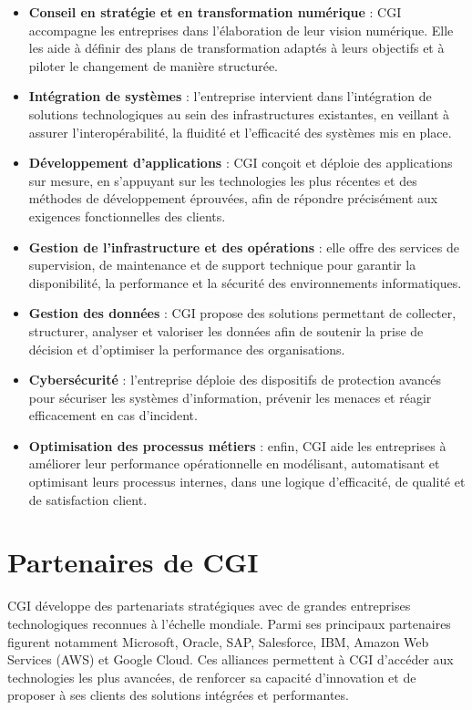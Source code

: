 \documentclass[12pt,a4paper]{report}
\begin{document}
\begin{itemize}
\item
  \textbf{Conseil en stratégie et en transformation numérique} : CGI
  accompagne les entreprises dans l'élaboration de leur vision
  numérique. Elle les aide à définir des plans de transformation adaptés
  à leurs objectifs et à piloter le changement de manière structurée.
\item
  \textbf{Intégration de systèmes} : l'entreprise intervient dans
  l'intégration de solutions technologiques au sein des infrastructures
  existantes, en veillant à assurer l'interopérabilité, la fluidité et
  l'efficacité des systèmes mis en place.
\item
  \textbf{Développement d'applications} : CGI conçoit et déploie des
  applications sur mesure, en s'appuyant sur les technologies les plus
  récentes et des méthodes de développement éprouvées, afin de répondre
  précisément aux exigences fonctionnelles des clients.
\item
  \textbf{Gestion de l'infrastructure et des opérations} : elle offre
  des services de supervision, de maintenance et de support technique
  pour garantir la disponibilité, la performance et la sécurité des
  environnements informatiques.
\item
  \textbf{Gestion des données} : CGI propose des solutions permettant de
  collecter, structurer, analyser et valoriser les données afin de
  soutenir la prise de décision et d'optimiser la performance des
  organisations.
\item
  \textbf{Cybersécurité} : l'entreprise déploie des dispositifs de
  protection avancés pour sécuriser les systèmes d'information, prévenir
  les menaces et réagir efficacement en cas d'incident.
\item
  \textbf{Optimisation des processus métiers} : enfin, CGI aide les
  entreprises à améliorer leur performance opérationnelle en modélisant,
  automatisant et optimisant leurs processus internes, dans une logique
  d'efficacité, de qualité et de satisfaction client.
\end{itemize}

\section{Partenaires de CGI}

CGI développe des partenariats stratégiques avec de grandes entreprises
technologiques reconnues à l'échelle mondiale. Parmi ses principaux
partenaires figurent notamment Microsoft, Oracle, SAP, Salesforce, IBM,
Amazon Web Services (AWS) et Google Cloud. Ces alliances permettent à
CGI d'accéder aux technologies les plus avancées, de renforcer sa
capacité d'innovation et de proposer à ses clients des solutions
intégrées et performantes.
\end{document}
